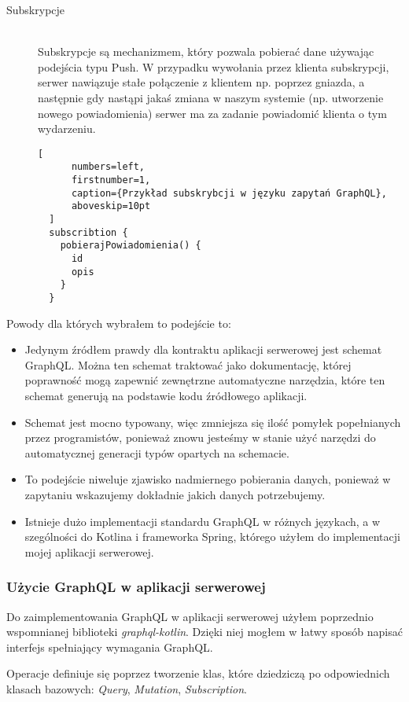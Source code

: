 \begin{description}
\item[Subskrypcje] \hfill \\ Subskrypcje są mechanizmem, który pozwala pobierać dane używając podejścia typu Push. W przypadku wywołania przez klienta subskrypcji, serwer nawiązuje stałe połączenie z klientem np. poprzez gniazda, a następnie gdy nastąpi jakaś zmiana w naszym systemie (np. utworzenie nowego powiadomienia) serwer ma za zadanie powiadomić klienta o tym wydarzeniu.
  \begin{addmargin}[6mm]{0mm}
  \begin{lstlisting}[
      numbers=left,
      firstnumber=1,
      caption={Przykład subskrybcji w języku zapytań GraphQL},
      aboveskip=10pt
  ]
  subscribtion {
    pobierajPowiadomienia() {
      id
      opis
    }
  }
  \end{lstlisting}
  \end{addmargin}
\end{description}
Powody dla których wybrałem to podejście to:
\begin{itemize}
  \item Jedynym źródłem prawdy dla kontraktu aplikacji serwerowej jest schemat GraphQL. Można ten schemat traktować jako dokumentację, której poprawność mogą zapewnić zewnętrzne automatyczne narzędzia, które ten schemat generują na podstawie kodu źródłowego aplikacji.
  \item Schemat jest mocno typowany, więc zmniejsza się ilość pomyłek popełnianych przez programistów, ponieważ znowu jesteśmy w stanie użyć narzędzi do automatycznej generacji typów opartych na schemacie.
  \item To podejście niweluje zjawisko nadmiernego pobierania danych, ponieważ w zapytaniu wskazujemy dokładnie jakich danych potrzebujemy.
  \item Istnieje dużo implementacji standardu GraphQL w różnych językach, a w szególności do Kotlina i frameworka Spring, którego użyłem do implementacji mojej aplikacji serwerowej.
\end{itemize}

\subsubsection{Użycie GraphQL w aplikacji serwerowej}
Do zaimplementowania GraphQL w aplikacji serwerowej użyłem poprzednio wspomnianej biblioteki \emph{graphql-kotlin}. Dzięki niej mogłem w łatwy sposób napisać interfejs spełniający wymagania GraphQL. 

Operacje definiuje się poprzez tworzenie klas, które dziedziczą po odpowiednich klasach bazowych: \emph{Query}, \emph{Mutation}, \emph{Subscription}. 

